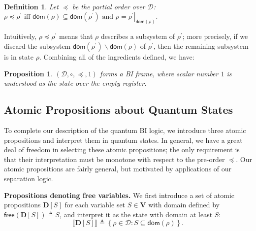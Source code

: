\documentclass[conference,compsoc, 10pt]{IEEEtran}
\newcommand{\jh}[1]{\textit{\color{red}[JH] : #1}}
\newcommand{\lz}[1]{\textit{\color{blue}[LZ] : #1}}
\newtheorem{definition}{Definition}[section]
\newtheorem{proposition}{Proposition}[section]
\newcommand {\cD } {{\mathcal{D}}}
\newcommand {\bD} {{\mathbf{D}}}
\newcommand {\dom }[1] {{\mathsf{dom}\!\left(#1\right)}}
\newcommand {\free }[1] {{\mathsf{free}\left(#1\right)}}
\newcommand {\rt }[2] {{\left.{#1}\right|_{#2}}}
\newcommand {\vars } {\mathbf{V}}
\newcommand {\sem}[1] {\llbracket#1\rrbracket}
\begin{document}
	\begin{definition}
		\label{def partial order quantum state}
		Let $\preceq$ be the partial order over $\cD$: 
		$
		\rho\preceq\rho^\prime \text{\ iff\ } 
		\dom{\rho}\subseteq\dom{\rho^\prime} \text{\ and\ } \rho = \rt{\rho^\prime}{\dom{\rho}}.
		$
	\end{definition}	
  Intuitively, $\rho \preceq \rho^\prime$ means that $\rho$ describes a
  subsystem of $\rho^\prime$; more precisely, if we discard the subsystem
  $\dom{\rho^\prime}\backslash\dom{\rho}$ of $\rho^\prime$, then the remaining
  subsystem is in state  $\rho$. Combining all of the ingredients defined, we
  have:
	\begin{proposition}\label{prop quantum BI frame} $(\cD,\circ, \preceq,1)$ forms a BI frame, where scalar number $1$ is understood as the state over the empty register. \end{proposition}	

	
	\subsection{Atomic Propositions about Quantum States}
	\label{sec free choice of AP}
	
  To complete our description of the quantum BI logic, we introduce three atomic
  propositions and interpret them in quantum states. In general, we have a great
  deal of freedom in selecting these atomic propositions; the only requirement
  is that their interpretation must be monotone with respect to the pre-order
  $\preceq$. Our atomic propositions are fairly general, but motivated by
  applications of our separation logic.
	
	{\vskip 3pt}
	
	\noindent\textbf{Propositions denoting free variables.} We first introduce a set of atomic propositions $\bD[S]$ for each variable set $S\in\vars$ with domain defined by $\free{\bD[S]}\triangleq S$, and interpret it as the state with domain at least $S$:
	\begin{equation}\label{atom-0}
	\sem{\bD[S]} \triangleq \left\{\rho\in\cD: S\subseteq\dom{\rho}\right\}.\end{equation}
	
	{\vskip 3pt}
	
\end{document}
